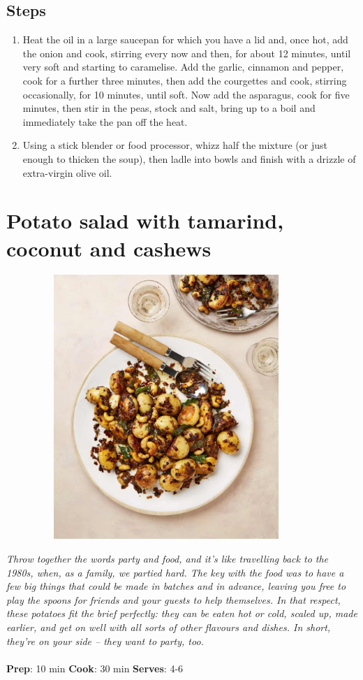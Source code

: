 \documentclass{book}
\begin{document}
\subsection*{Steps}
\begin{enumerate}
\item Heat the oil in a large saucepan for which you have a lid and, once hot, add the onion and cook, stirring every now and then, for about 12 minutes, until very soft and starting to caramelise. Add the garlic, cinnamon and pepper, cook for a further three minutes, then add the courgettes and cook, stirring occasionally, for 10 minutes, until soft. Now add the asparagus, cook for five minutes, then stir in the peas, stock and salt, bring up to a boil and immediately take the pan off the heat.
\item Using a stick blender or food processor, whizz half the mixture (or just enough to thicken the soup), then ladle into bowls and finish with a drizzle of extra-virgin olive oil.
\end{enumerate}
\newpage

\section{Potato salad with tamarind, coconut and cashews}
\begin{figure}
\centering\includegraphics[width=10cm,height=10cm,keepaspectratio]{Recipe_Pictures/Potato_salad_with_tamarind,_coconut_and_cashews.png}
\end{figure}
\emph{Throw together the words party and food, and it’s like travelling back to the 1980s, when, as a family, we partied hard. The key with the food was to have a few big things that could be made in batches and in advance, leaving you free to play the spoons for friends and your guests to help themselves. In that respect, these potatoes fit the brief perfectly: they can be eaten hot or cold, scaled up, made earlier, and get on well with all sorts of other flavours and dishes. In short, they’re on your side – they want to party, too.}\\\\ 
\textbf{Prep}: 10 min
\textbf{Cook}: 30 min
\textbf{Serves}: 4-6
\end{document}

